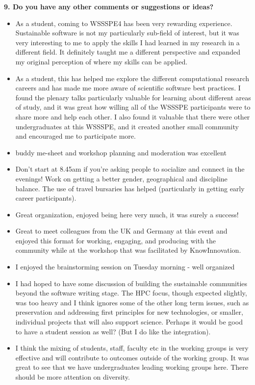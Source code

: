 \noindent \textbf{9. Do you have any other comments or suggestions or ideas?}

\begin{itemize}
\item As a student, coming to WSSSPE4 has been very rewarding experience. Sustainable software is not my particularly sub-field of interest, but it was very interesting to me to apply the skills I had learned in my research in a different field. It definitely taught me a different perspective and expanded my original perception of where my skills can be applied.
\item As a student, this has helped me explore the different computational research careers and has made me more aware of scientific software best practices.  I found the plenary talks particularly valuable for learning about different areas of study, and it was great how willing all of the WSSSPE participants were to share more and help each other. I also found it valuable that there were other undergraduates at this WSSSPE, and it created another small community and encouraged me to participate more.
\item buddy me-sheet and workshop planning and moderation was excellent
\item Don't start at 8.45am if you're asking people to socialize and connect in the evenings! Work on getting a better gender, geographical and discipline balance. The use of travel bursaries has helped (particularly in getting early career participants).
\item Great organization, enjoyed being here very much, it was surely a success!
\item Great to meet colleagues from the UK and Germany at this event and enjoyed this format for working, engaging, and producing with the community while at the workshop that was facilitated by KnowInnovation.
\item I enjoyed the brainstorming session on Tuesday morning - well organized
\item I had hoped to have some discussion of building the sustainable communities beyond the software writing stage. The HPC focus, though expected slightly, was too heavy and I think ignores some of the other long term issues, such as preservation and addressing first principles for new technologies, or smaller, individual projects that will also support science. Perhaps it would be good to have a student session as well? (But I do like the integration).
\item I think the mixing of students, staff, faculty etc in the working groups is very effective and will contribute to  outcomes outside of the working group. It was great to see that we have undergraduates leading working groups here. There should be more attention on diversity.

\end{itemize}
